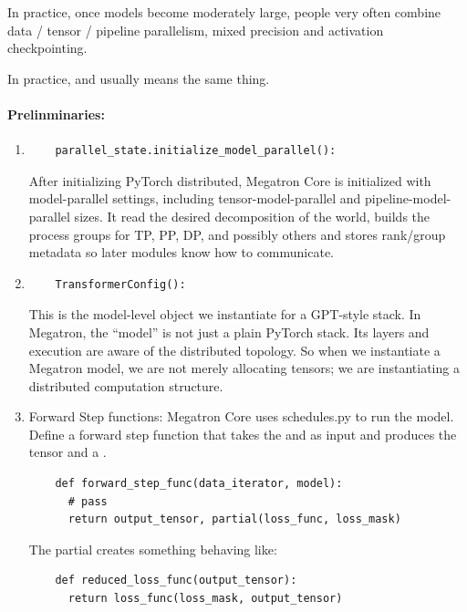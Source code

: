 \documentclass[11pt]{article}  %
\begin{document}
In practice, once models become moderately large, people very often combine data / tensor / pipeline parallelism, mixed precision and activation checkpointing.

In practice,  and  usually means the same thing.



\paragraph{Prelinminaries:}

\begin{enumerate}
  \item \begin{lstlisting}
    parallel_state.initialize_model_parallel():
  \end{lstlisting}
  After initializing PyTorch distributed, Megatron Core is initialized with model-parallel settings, including tensor-model-parallel and pipeline-model-parallel sizes.
  It read the desired decomposition of the world, builds the process groups for TP, PP, DP, and possibly others and stores rank/group metadata so later modules know how to communicate.

  \item \begin{lstlisting}
    TransformerConfig():
  \end{lstlisting}
  This is the model-level object we instantiate for a GPT-style stack. In Megatron, the ``model'' is not just a plain PyTorch stack. 
  Its layers and execution are aware of the distributed topology. 
  So when we instantiate a Megatron model, we are not merely allocating tensors; we are instantiating a distributed computation structure.

  \item Forward Step functions: Megatron Core uses schedules.py to run the model. Define a forward step function that takes the  and  as input and produces the  tensor and a .
  \begin{lstlisting}
    def forward_step_func(data_iterator, model):
      # pass 
      return output_tensor, partial(loss_func, loss_mask)  
  \end{lstlisting}
  The partial creates something behaving like:
  \begin{lstlisting}
    def reduced_loss_func(output_tensor):
      return loss_func(loss_mask, output_tensor)
  \end{lstlisting}


\end{enumerate}
\end{document}
